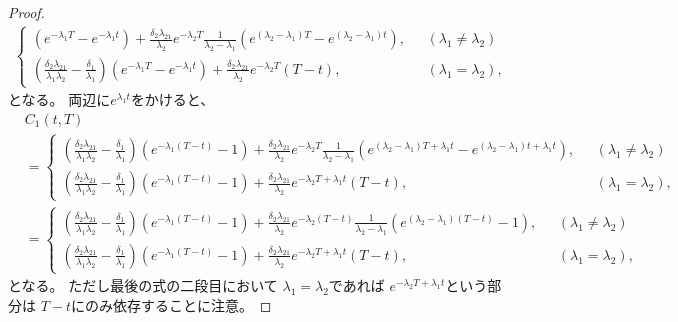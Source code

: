 \documentclass[uplatex]{jsarticle}
\theoremstyle{definition}
\begin{document}
\begin{proof}
\begin{align*}
\begin{cases}
      \left( e^{-\lambda_1T}-e^{-\lambda_1t} \right)
      + \frac{\delta_2\lambda_{21}}{\lambda_2}e^{-\lambda_2T}
      \frac{1}{\lambda_2-\lambda_1}
      \left( e^{(\lambda_2-\lambda_1)T}-e^{(\lambda_2-\lambda_1)t}\right),
      \ \ \ &(\lambda_1\neq \lambda_2) \\
      \left( \frac{\delta_2\lambda_{21}}{\lambda_1\lambda_2}
      - \frac{\delta_1}{\lambda_1} \right)
      \left( e^{-\lambda_1T}-e^{-\lambda_1t} \right)
      + \frac{\delta_2\lambda_{21}}{\lambda_2}e^{-\lambda_2T}(T-t),
      \ \ \ &(\lambda_1=\lambda_2),
    \end{cases}
  \end{align*}
  となる。
  両辺に\(e^{\lambda_1t}\)をかけると、
  \begin{align*}
    &C_1(t,T) \\
    &=
    \begin{cases}
      \left( \frac{\delta_2\lambda_{21}}{\lambda_1\lambda_2}
      - \frac{\delta_1}{\lambda_1} \right)\left( e^{-\lambda_1(T-t)}-1 \right)
      + \frac{\delta_2\lambda_{21}}{\lambda_2}e^{-\lambda_2T}
      \frac{1}{\lambda_2-\lambda_1}
      \left( e^{(\lambda_2-\lambda_1)T+\lambda_1t}
      -e^{(\lambda_2-\lambda_1)t+\lambda_1t}\right),
      \ \ \ &(\lambda_1\neq \lambda_2) \\
      \left( \frac{\delta_2\lambda_{21}}{\lambda_1\lambda_2}
      - \frac{\delta_1}{\lambda_1} \right)\left( e^{-\lambda_1(T-t)}-1 \right)
      + \frac{\delta_2\lambda_{21}}{\lambda_2}e^{-\lambda_2T+\lambda_1t}(T-t),
      \ \ \ &(\lambda_1=\lambda_2),
    \end{cases} \\
    &=
    \begin{cases}
      \left( \frac{\delta_2\lambda_{21}}{\lambda_1\lambda_2}
      - \frac{\delta_1}{\lambda_1} \right)\left( e^{-\lambda_1(T-t)}-1 \right)
      + \frac{\delta_2\lambda_{21}}{\lambda_2}e^{-\lambda_2(T-t)}
      \frac{1}{\lambda_2-\lambda_1}
      \left( e^{(\lambda_2-\lambda_1)(T-t)}-1 \right),
      \ \ \ &(\lambda_1\neq \lambda_2) \\
      \left( \frac{\delta_2\lambda_{21}}{\lambda_1\lambda_2}
      - \frac{\delta_1}{\lambda_1} \right)\left( e^{-\lambda_1(T-t)}-1 \right)
      + \frac{\delta_2\lambda_{21}}{\lambda_2}e^{-\lambda_2T+\lambda_1t}(T-t),
      \ \ \ &(\lambda_1=\lambda_2),
    \end{cases}
  \end{align*}
  となる。
  ただし最後の式の二段目において
  \(\lambda_1=\lambda_2\)であれば
  \(e^{-\lambda_2T+\lambda_1t}\)という部分は
  \(T-t\)にのみ依存することに注意。


\end{proof}
\end{document}
